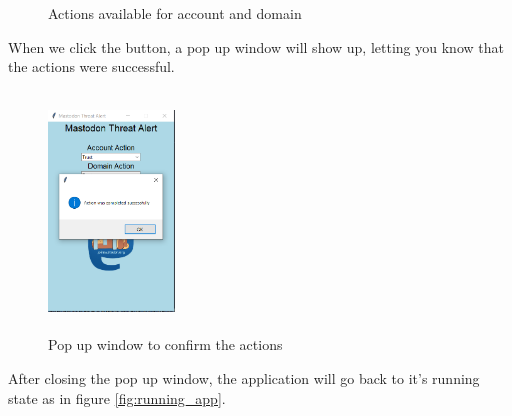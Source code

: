 \begin{figure}[H]
	\centering
	\hspace{5pt}
	\caption{Actions available for account and domain}
	\label{fig:action_both}
\end{figure}
When we click the button, a pop up window will show up, letting
you know that the actions were successful.
\begin{figure}[H]
	\centering
	\includegraphics[width=0.3\textwidth,height=240px]{images/successaction.png}
	\caption{Pop up window to confirm the actions}
	\label{fig:pop_up_action}
\end{figure}
After closing the pop up window, the application will go back to
it's running state as in figure \ref{fig:running_app}.

